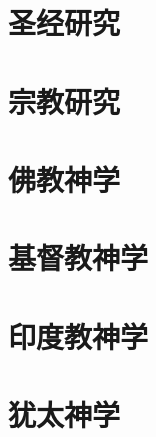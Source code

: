 \documentclass[UTF8]{RepresentationUniverse}
\begin{document}
\section{圣经研究}
\section{宗教研究}
\section{佛教神学}
\section{基督教神学}
\section{印度教神学}
\section{犹太神学}
\end{document}
